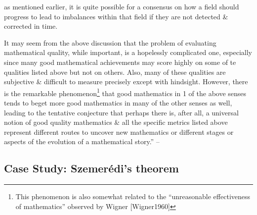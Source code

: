 \documentclass[oneside]{book}
\numberwithin{equation}{section}
\begin{document}
as mentioned earlier, it is quite possible for a consensus on how a field should progress to lead to imbalances within that field if they are not detected \& corrected in time.

It may seem from the above discussion that the problem of evaluating mathematical quality, while important, is a hopelessly complicated one, especially since many good mathematical achievements may score highly on some of te qualities listed above but not on others. Also, many of these qualities are subjective \& difficult to measure precisely except with hindsight. However, there is the remarkable phenomenon\footnote{This phenomenon is also somewhat related to the ``unreasonable effectiveness of mathematics'' observed by Wigner [Wigner1960]} that good mathematics in 1 of the above senses tends to beget more good mathematics in many of the other senses as well, leading to the tentative conjecture that perhaps there is, after all, a universal notion of good quality mathematics \& all the specific metrics listed above represent different routes to uncover new mathematics or different stages or aspects of the evolution of a mathematical story.'' -- \cite[pp. 623--626]{Tao2007}

\subsection{Case Study: Szemer\'edi's theorem}
\end{document}
